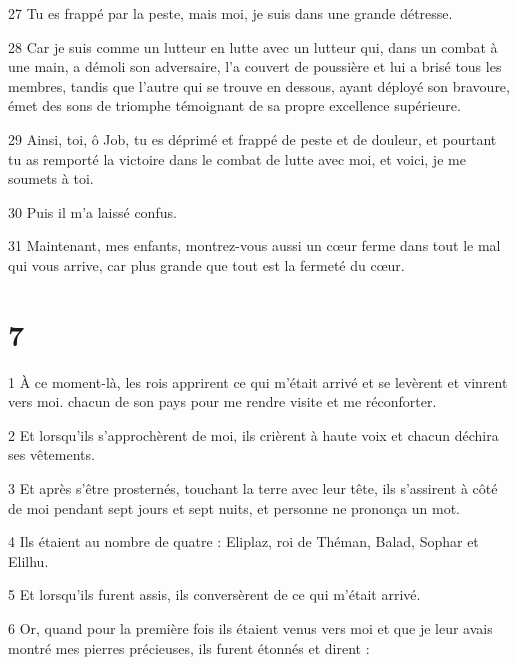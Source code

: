 \par 27 Tu es frappé par la peste, mais moi, je suis dans une grande détresse.

\par 28 Car je suis comme un lutteur en lutte avec un lutteur qui, dans un combat à une main, a démoli son adversaire, l'a couvert de poussière et lui a brisé tous les membres, tandis que l'autre qui se trouve en dessous, ayant déployé son bravoure, émet des sons de triomphe témoignant de sa propre excellence supérieure.

\par 29 Ainsi, toi, ô Job, tu es déprimé et frappé de peste et de douleur, et pourtant tu as remporté la victoire dans le combat de lutte avec moi, et voici, je me soumets à toi.

\par 30 Puis il m'a laissé confus.

\par 31 Maintenant, mes enfants, montrez-vous aussi un cœur ferme dans tout le mal qui vous arrive, car plus grande que tout est la fermeté du cœur.

\chapter{7}

\par 1 À ce moment-là, les rois apprirent ce qui m'était arrivé et se levèrent et vinrent vers moi. chacun de son pays pour me rendre visite et me réconforter.

\par 2 Et lorsqu'ils s'approchèrent de moi, ils crièrent à haute voix et chacun déchira ses vêtements.

\par 3 Et après s'être prosternés, touchant la terre avec leur tête, ils s'assirent à côté de moi pendant sept jours et sept nuits, et personne ne prononça un mot.

\par 4 Ils étaient au nombre de quatre : Eliplaz, roi de Théman, Balad, Sophar et Elilhu.

\par 5 Et lorsqu'ils furent assis, ils conversèrent de ce qui m'était arrivé.

\par 6 Or, quand pour la première fois ils étaient venus vers moi et que je leur avais montré mes pierres précieuses, ils furent étonnés et dirent :

